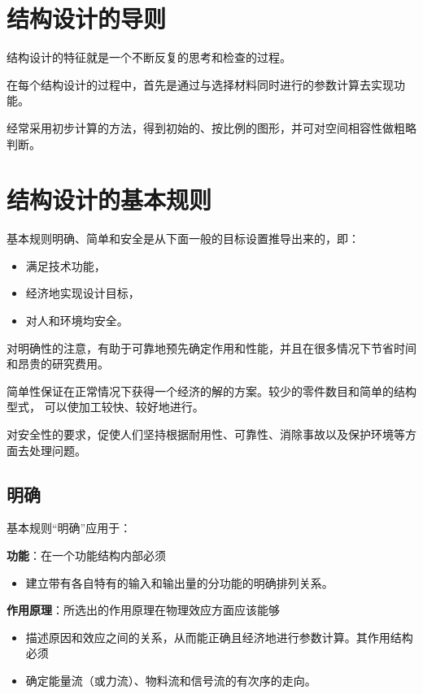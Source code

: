 \documentclass[letterpaper,10pt,english]{sphinxmanual}
\begin{document}
\section{结构设计的导则}
\label{unit6:id3}
结构设计的特征就是一个不断反复的思考和检查的过程。

在每个结构设计的过程中，首先是通过与选择材料同时进行的参数计算去实现功能。

经常采用初步计算的方法，得到初始的、按比例的图形，并可对空间相容性做粗略判断。


\section{结构设计的基本规则}
\label{unit6:id4}
基本规则明确、简单和安全是从下面一般的目标设置推导出来的，即：
\begin{itemize}
\item {} 
满足技术功能，

\item {} 
经济地实现设计目标，

\item {} 
对人和环境均安全。

\end{itemize}

对明确性的注意，有助于可靠地预先确定作用和性能，并且在很多情况下节省时间和昂贵的研究费用。

简单性保证在正常情况下获得一个经济的解的方案。较少的零件数目和简单的结构型式，
可以使加工较快、较好地进行。

对安全性的要求，促使人们坚持根据耐用性、可靠性、消除事故以及保护环境等方面去处理问题。


\subsection{明确}
\label{unit6:id5}
基本规则“明确”应用于：

\textbf{功能}：在一个功能结构内部必须
\begin{itemize}
\item {} 
建立带有各自特有的输入和输出量的分功能的明确排列关系。

\end{itemize}

\textbf{作用原理}：所选出的作用原理在物理效应方面应该能够
\begin{itemize}
\item {} 
描述原因和效应之间的关系，从而能正确且经济地进行参数计算。其作用结构必须

\item {} 
确定能量流（或力流）、物料流和信号流的有次序的走向。

\end{itemize}
\end{document}
